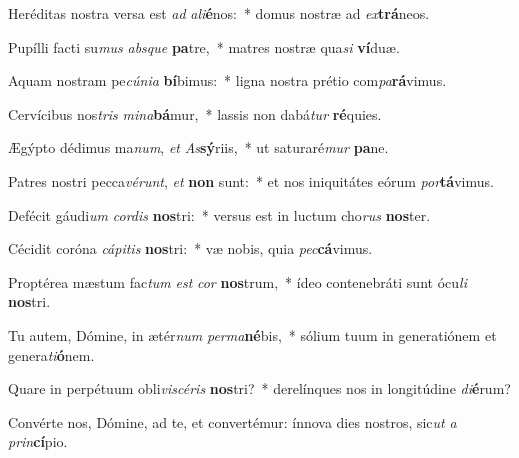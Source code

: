 \item Heréditas nostra versa est \textit{ad} \textit{a}\textit{li}\textbf{é}nos:~* domus nostræ ad \textit{ex}\textbf{trá}neos.
\item Pupílli facti su\textit{mus} \textit{abs}\textit{que} \textbf{pa}tre,~* matres nostræ qua\textit{si} \textbf{ví}duæ.
\item Aquam nostram pe\textit{cú}\textit{ni}\textit{a} \textbf{bí}bimus:~* ligna nostra prétio com\textit{pa}\textbf{rá}vimus.
\item Cervícibus nos\textit{tris} \textit{mi}\textit{na}\textbf{bá}mur,~* lassis non dabá\textit{tur} \textbf{ré}quies.
\item Ægýpto dédimus ma\textit{num}, \textit{et} \textit{As}\textbf{sý}riis,~* ut saturaré\textit{mur} \textbf{pa}ne.
\item Patres nostri pecca\textit{vé}\textit{runt}, \textit{et} \textbf{non} sunt:~* et nos iniquitátes eórum \textit{por}\textbf{tá}vimus.
\item Defécit gáudi\textit{um} \textit{cor}\textit{dis} \textbf{nos}tri:~* versus est in luctum cho\textit{rus} \textbf{nos}ter.
\item Cécidit coróna \textit{cá}\textit{pi}\textit{tis} \textbf{nos}tri:~* væ nobis, quia \textit{pec}\textbf{cá}vimus.
\item Proptérea mæstum fac\textit{tum} \textit{est} \textit{cor} \textbf{nos}trum,~* ídeo contenebráti sunt ócu\textit{li} \textbf{nos}tri.
\item Tu autem, Dómine, in ætér\textit{num} \textit{per}\textit{ma}\textbf{né}bis,~* sólium tuum in generatiónem et genera\textit{ti}\textbf{ó}nem.
\item Quare in perpétuum obli\textit{vi}\textit{scé}\textit{ris} \textbf{nos}tri?~* derelínques nos in longitúdine \textit{di}\textbf{é}rum?
\item Convérte nos, Dómine, ad te, et convertémur: ínnova dies nostros, sic\textit{ut} \textit{a} \textit{prin}\textbf{cí}pio.
